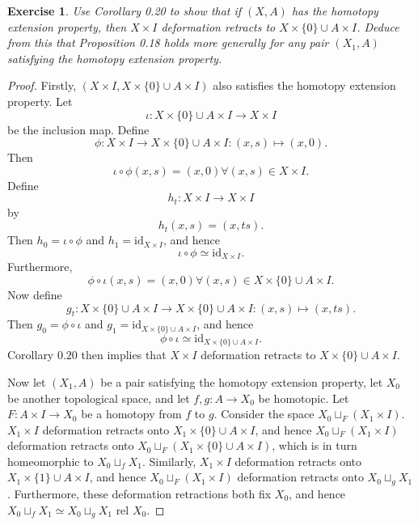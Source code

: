 \documentclass{article}
\newtheorem{exercise}{Exercise}[subsection]
\begin{document}
\begin{exercise}
Use Corollary 0.20 to show that if $(X,A)$ has the homotopy extension property, then $X\times I$ deformation retracts to $X\times\{0\}\cup A\times I$. Deduce from this that Proposition 0.18 holds more generally for any pair $(X_1,A)$ satisfying the homotopy extension property.
\end{exercise}
\begin{proof}
Firstly, $(X\times I, X\times\{0\}\cup A\times I)$ also satisfies the homotopy extension property. Let \[\iota:X\times\{0\}\cup A\times I\to X\times I\] be the inclusion map. Define \[\phi:X\times I\to X\times\{0\}\cup A\times I:(x,s)\mapsto(x,0).\] Then \[\iota\circ \phi(x,s)=(x,0)\forall (x,s)\in X\times I.\] Define \[h_t:X\times I\to X\times I\] by \[h_t(x,s)=(x,ts).\] Then $h_0=\iota\circ\phi$ and $h_1=\text{id}_{X\times I}$, and hence \[\iota\circ\phi\simeq\text{id}_{X\times I}.\] Furthermore, \[\phi\circ\iota(x,s)=(x,0)\forall (x,s)\in X\times \{0\}\cup A\times I.\] Now define \[g_t:X\times\{0\}\cup A\times I\to X\times\{0\}\cup A\times I:(x,s)\mapsto(x,ts).\] Then $g_0=\phi\circ\iota$ and $g_1=\text{id}_{X\times\{0\}\cup A\times I}$, and hence \[\phi\circ\iota\simeq \text{id}_{X\times\{0\}\cup A\times I}.\] Corollary $0.20$ then implies that $X\times I$ deformation retracts to $X\times\{0\}\cup A\times I$.\newline


Now let $(X_1,A)$ be a pair satisfying the homotopy extension property, let $X_0$ be another topological space, and let $f,g:A\to X_0$ be homotopic. Let $F:A\times I\to X_0$ be a homotopy from $f$ to $g$. Consider the space $X_0\sqcup_F(X_1\times I)$. $X_1\times I$ deformation retracts onto $X_1\times\{0\}\cup A\times I$, and hence $X_0\sqcup_F(X_1\times I)$ deformation retracts onto $X_0\sqcup_F(X_1\times\{0\}\cup A\times I)$, which is in turn homeomorphic to $X_0\sqcup_fX_1$. Similarly, $X_1\times I$ deformation retracts onto $X_1\times\{1\}\cup A\times I$, and hence $X_0\sqcup_F(X_1\times I)$ deformation retracts onto $X_0\sqcup_gX_1$. Furthermore, these deformation retractions both fix $X_0$, and hence $X_0\sqcup_fX_1\simeq X_0\sqcup_gX_1\text{ rel }X_0$.
\end{proof}
\end{document}
